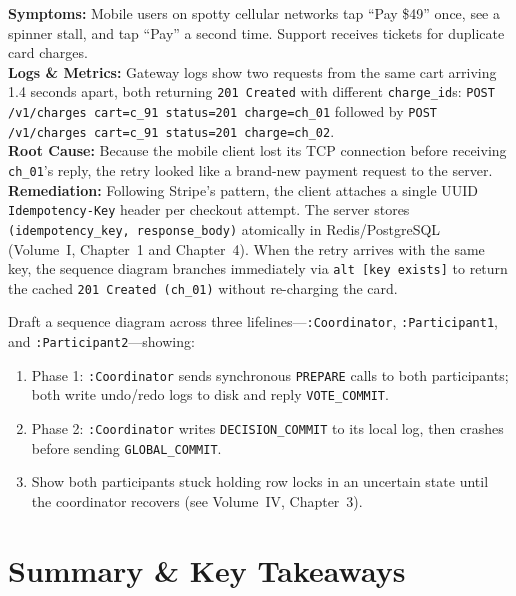 \begin{realworldbox}
\textbf{Symptoms:} Mobile users on spotty cellular networks tap ``Pay \$49'' once, see a spinner stall, and tap ``Pay'' a second time. Support receives tickets for duplicate card charges.\\
\textbf{Logs \& Metrics:} Gateway logs show two requests from the same cart arriving 1.4 seconds apart, both returning \texttt{201 Created} with different \texttt{charge\_id}s:
\texttt{POST /v1/charges cart=c\_91 status=201 charge=ch\_01} followed by
\texttt{POST /v1/charges cart=c\_91 status=201 charge=ch\_02}.\\
\textbf{Root Cause:} Because the mobile client lost its TCP connection before receiving \texttt{ch\_01}'s reply, the retry looked like a brand-new payment request to the server.\\
\textbf{Remediation:} Following Stripe's pattern, the client attaches a single UUID \texttt{Idempotency-Key} header per checkout attempt. The server stores \texttt{(idempotency\_key, response\_body)} atomically in Redis/PostgreSQL (Volume~I, Chapter~1 and Chapter~4). When the retry arrives with the same key, the sequence diagram branches immediately via \texttt{alt [key exists]} to return the cached \texttt{201 Created (ch\_01)} without re-charging the card.
\end{realworldbox}

\begin{tryityourselfbox}
Draft a sequence diagram across three lifelines---\texttt{:Coordinator}, \texttt{:Participant1}, and \texttt{:Participant2}---showing:
\begin{enumerate}
  \item Phase 1: \texttt{:Coordinator} sends synchronous \texttt{PREPARE} calls to both participants; both write undo/redo logs to disk and reply \texttt{VOTE\_COMMIT}.
  \item Phase 2: \texttt{:Coordinator} writes \texttt{DECISION\_COMMIT} to its local log, then crashes before sending \texttt{GLOBAL\_COMMIT}.
  \item Show both participants stuck holding row locks in an uncertain state until the coordinator recovers (see Volume~IV, Chapter~3).
\end{enumerate}
\end{tryityourselfbox}

\section{Summary \protect\& Key Takeaways}


